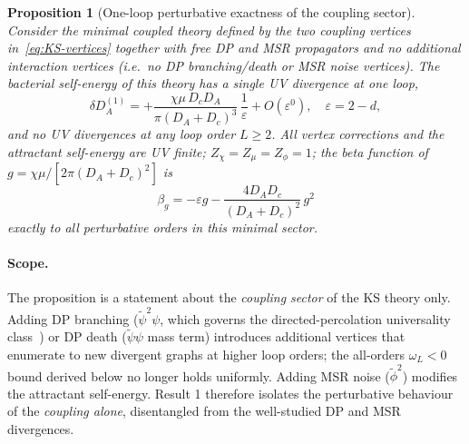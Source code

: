 \documentclass[11pt,a4paper]{article}
\newcommand{\psit}{\tilde\psi}
\newcommand{\phit}{\tilde\phi}
\theoremstyle{plain}
\newtheorem{proposition}[theorem]{Proposition}
\begin{document}
\begin{proposition}[One-loop perturbative exactness of the
coupling sector]
\label{prop:oneloop-exact}
Consider the minimal coupled theory defined by the two coupling
vertices in~\eqref{eq:KS-vertices} together with free DP and MSR
propagators and \emph{no additional interaction vertices}
(i.e.\ no DP branching/death or MSR noise vertices).  The
bacterial self-energy of this theory has a single UV divergence
at one loop,
\begin{equation}\label{eq:deltaDA}
  \delta D_A^{(1)}
  = +\frac{\chi\mu\,D_c D_A}{\pi(D_A+D_c)^3}\,\frac{1}{\varepsilon}
  + O(\varepsilon^0), \quad \varepsilon = 2 - d,
\end{equation}
and \emph{no} UV divergences at any loop order $L \geq 2$.
All vertex corrections and the attractant self-energy are UV
finite; $Z_\chi = Z_\mu = Z_\phi = 1$; the beta function of
$g = \chi\mu/[2\pi(D_A+D_c)^2]$ is
\begin{equation}\label{eq:beta}
  \beta_g
  = -\varepsilon g - \frac{4 D_A D_c}{(D_A+D_c)^2}\,g^2
\end{equation}
\emph{exactly} to all perturbative orders in this minimal sector.
\end{proposition}

\paragraph{Scope.}
The proposition is a statement about the \emph{coupling sector}
of the KS theory only.  Adding DP branching ($\psit^2\psi$, which
governs the directed-percolation universality class~\cite{Tauber})
or DP death ($\psit\psi$ mass term) introduces additional
vertices that enumerate to new divergent graphs at higher loop
orders; the all-orders $\omega_L < 0$ bound derived below no
longer holds uniformly.  Adding MSR noise ($\phit^2$) modifies
the attractant self-energy.  Result 1 therefore isolates the
perturbative behaviour of the \emph{coupling alone}, disentangled
from the well-studied DP and MSR divergences.
\end{document}
